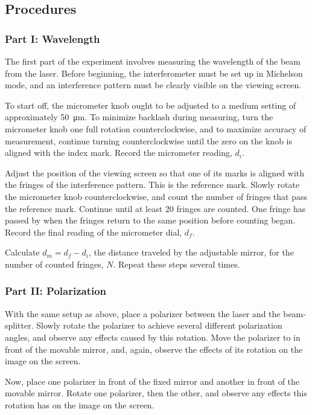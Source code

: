 \documentclass[12pt]{article}
\begin{document}
\subsection{Procedures}

\subsubsection{Part I: Wavelength}

\qq The first part of the experiment involves measuring the wavelength of the
beam from the laser. Before beginning, the interferometer must be set up in Michelson
mode, and an interference pattern must be clearly visible on the viewing
screen. 

\qq To start off, the micrometer knob ought to be adjusted to a medium setting
of approximately \SI{50}{\micro\meter}. To minimize backlash during measuring,
turn the micrometer knob one full rotation counterclockwise, and to maximize
accuracy of measurement, continue turning counterclockwise until the zero on the
knob is aligned with the index mark. Record the micrometer reading, \(d_i\).

\qq Adjust the position of the viewing screen so that one of its marks
is aligned with the fringes of the interference pattern. This is the reference
mark. Slowly rotate the micrometer knob counterclockwise, and count the number
of fringes that pass the reference mark. Continue until at least 20 fringes are
counted. One fringe has passed by when the fringes return to the same position
before counting began. Record the final reading of the micrometer dial, \(d_f\).

\qq Calculate \(d_m = d_f - d_i\), the distance traveled by the adjustable
mirror, for the number of counted fringes, \(N\). Repeat these steps several
times.

\subsubsection{Part II: Polarization}

\qq With the same setup as above, place a polarizer between the laser and the
beam-splitter. Slowly rotate the polarizer to achieve several different
polarization angles, and observe any effects caused by this rotation. Move the
polarizer to in front of the movable mirror, and, again, observe the effects of
its rotation on the image on the screen.

\qq Now, place one polarizer in front of the fixed mirror and another in front
of the movable mirror. Rotate one polarizer, then the other, and observe any
effects this rotation has on the image on the screen.
\end{document}
